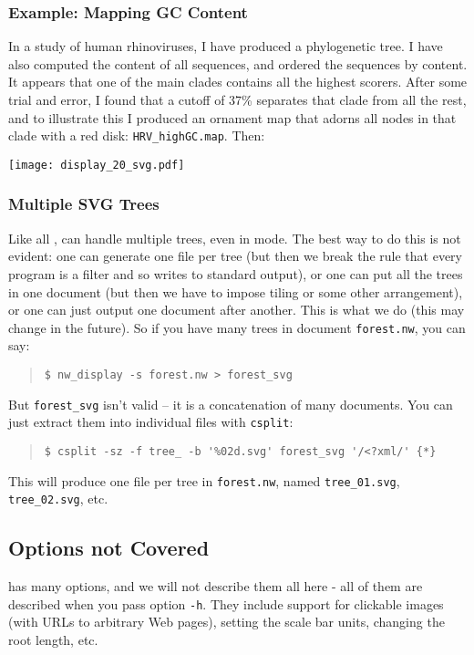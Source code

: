 \subsubsection{Example: Mapping GC Content}

In a study of human rhinoviruses, I have produced a phylogenetic tree. I have
also computed the \gc{} content of all sequences, and ordered the sequences by
\gc{} content. It appears that one of the main clades contains all the highest
scorers. After some trial and error, I found that a cutoff of 37\% \gc{}
separates that clade from all the rest, and to illustrate this I produced an
ornament map that adorns all nodes in that clade with a red disk:
\texttt{HRV\_highGC.map}. Then:


\texttt{[image: display\_20\_svg.pdf]}

\subsubsection{Multiple SVG Trees}

Like all \nutils, \display{} can handle multiple trees, even in \svg{} mode.
The best way to do this is not evident: one can generate one file per tree (but
then we break the rule that every program is a filter and so writes to standard
output), or one can put all the trees in one \svg{} document (but then we have
to impose tiling or some other arrangement), or one can just output one \svg{}
document after another. This is what we do (this may change in the future). So
if you have many trees in document \texttt{forest.nw}, you can say:
\begin{quote}
\verb+$ nw_display -s forest.nw > forest_svg+
\end{quote}
But \texttt{forest\_svg} isn't valid \svg{} -- it is a concatenation of many \svg{} documents. You can just extract them into individual files with \texttt{csplit}:
\begin{quote}
\verb+$ csplit -sz -f tree_ -b '%02d.svg' forest_svg '/<?xml/' {*}+
\end{quote}
This will produce one \svg{} file per tree in \texttt{forest.nw}, named \texttt{tree\_01.svg}, \texttt{tree\_02.svg}, etc.

\subsection{Options not Covered}

\display{} has many options, and we will not describe them all here - all of
them are described when you pass option \texttt{-h}. They include support for
clickable images (with URLs to arbitrary Web pages), setting the scale bar
units, changing the root length, etc. 
